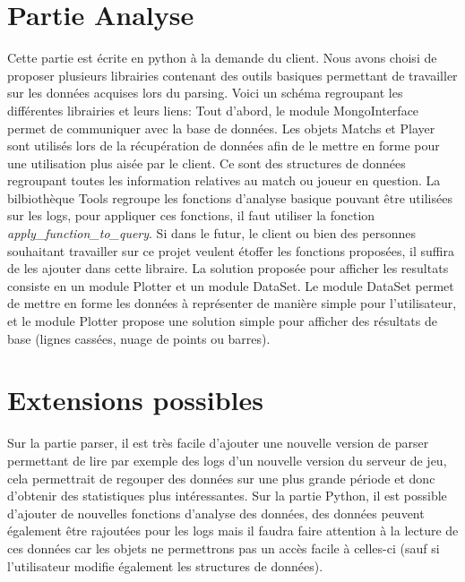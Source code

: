 \section{Partie Analyse}
Cette partie est écrite en python à la demande du client. Nous avons choisi de proposer plusieurs librairies contenant des outils basiques permettant de travailler sur les données acquises lors du parsing. Voici un schéma regroupant les différentes librairies et leurs liens:
Tout d'abord, le module MongoInterface permet de communiquer avec la base de données.\newline
Les objets Matchs et Player sont utilisés lors de la récupération de données afin de le mettre en forme pour une utilisation plus aisée par le client. Ce sont des structures de données regroupant toutes les information relatives au match ou joueur en question.\newline
La bilbiothèque Tools regroupe les fonctions d'analyse basique pouvant être utilisées sur les logs, pour appliquer ces fonctions, il faut utiliser la fonction \textit{apply\_function\_to\_query}. Si dans le futur, le client ou bien des personnes souhaitant travailler sur ce projet veulent étoffer les fonctions proposées, il suffira de les ajouter dans cette libraire.\newline
La solution proposée pour afficher les resultats consiste en un module Plotter et un module DataSet. Le module DataSet permet de mettre en forme les données à représenter de manière simple pour l'utilisateur, et le module Plotter propose une solution simple pour afficher des résultats de base (lignes cassées, nuage de points ou barres).

\section{Extensions possibles}
Sur la partie parser, il est très facile d'ajouter une nouvelle version de parser permettant de lire par exemple des logs d'un nouvelle version du serveur de jeu, cela permettrait de regouper des données sur une plus grande période et donc d'obtenir des statistiques plus intéressantes.\newline
Sur la partie Python, il est possible d'ajouter de nouvelles fonctions d'analyse des données, des données peuvent également être rajoutées pour les logs mais il faudra faire attention à la lecture de ces données car les objets ne permettrons pas un accès facile à celles-ci (sauf si l'utilisateur modifie également les structures de données).

